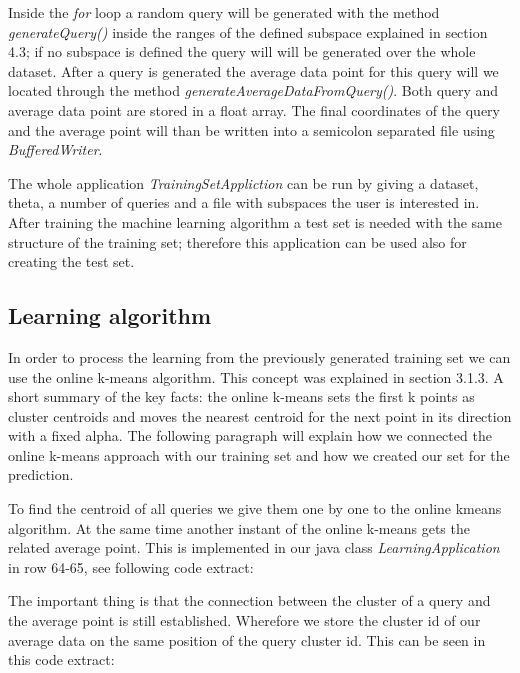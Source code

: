 \documentclass{lmproj}
\begin{document}
Inside the \textit{for} loop a random query will be generated with the method \textit{generateQuery()} inside the ranges of the defined subspace explained in section 4.3; if no subspace is defined the query will will be generated over the whole dataset. After a query is generated the average data point for this query will we located through the method \textit{generateAverageDataFromQuery()}. Both query and average data point are stored in a float array. The final coordinates of the query and the average point will than be written into a semicolon separated file using \textit{BufferedWriter}.

The whole application \textit{TrainingSetAppliction} can be run by giving a dataset, theta, a number of queries and a file with subspaces the user is interested in.
After training the machine learning algorithm a test set is needed with the same structure of the training set; therefore this application can be used also for creating the test set. 


\subsection{Learning algorithm}

In order to process the learning from the previously generated training set we can use the online k-means algorithm. This concept was explained in section 3.1.3.
A short summary of the key facts: the online k-means sets the first k points as cluster centroids and moves the nearest centroid for the next point in its direction with a fixed alpha. The following paragraph will explain how we connected the online k-means approach with our training set and how we created our set for the prediction.

To find the centroid of all queries we give them one by one to the online kmeans algorithm. At the same time another instant of the online k-means gets the related average point. This is implemented in our java class \textit{LearningApplication} in row 64-65, see following code extract:



The important thing is that the connection between the cluster of a query and the average point is still established. Wherefore we store the cluster id of our average data on the same position of the query cluster id. This can be seen in this code extract:

\end{document}
